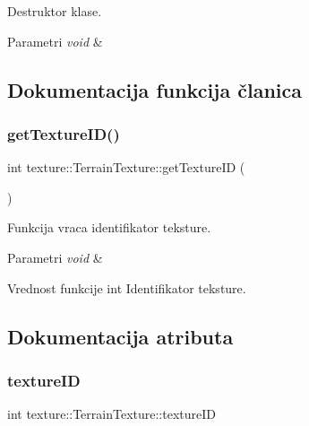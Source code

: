 Destruktor klase. 


\begin{DoxyParams}{Parametri}
{\em void} & \\
\hline
\end{DoxyParams}


\subsection{Dokumentacija funkcija članica}
\mbox{\label{classtexture_1_1TerrainTexture_a01ad68289523fa583d2892cf44d39b23}} 
\subsubsection{\texorpdfstring{get\+Texture\+I\+D()}{getTextureID()}}
{\footnotesize\ttfamily int texture\+::\+Terrain\+Texture\+::get\+Texture\+ID (\begin{DoxyParamCaption}{ }\end{DoxyParamCaption})}



Funkcija vraca identifikator teksture. 


\begin{DoxyParams}{Parametri}
{\em void} & \\
\hline
\end{DoxyParams}
\begin{DoxyReturn}{Vrednost funkcije}
int Identifikator teksture. 
\end{DoxyReturn}


\subsection{Dokumentacija atributa}
\mbox{\label{classtexture_1_1TerrainTexture_a52da27a891185b2df83c4e1c62fde3c6}} 
\subsubsection{\texorpdfstring{texture\+ID}{textureID}}
{\footnotesize\ttfamily int texture\+::\+Terrain\+Texture\+::texture\+ID\hspace{0.3cm}{\ttfamily [private]}}



